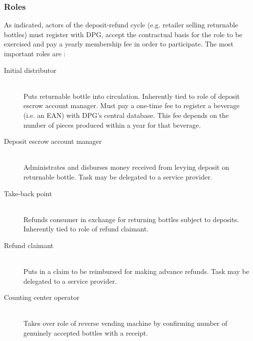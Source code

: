 
\subsubsection{Roles}
As indicated, actors of the deposit-refund cycle (e.g. retailer selling returnable bottles) must register with \ac{DPG}, accept the contractual basis for the role to be exercised and pay a yearly membership fee in order to participate. The most important roles are  \cite[pp.~15-16]{Hartlep2011Recycling}:   

\begin{description}
	\item[Initial distributor]
	\hfill \\
	Puts returnable bottle into circulation. Inherently tied to role of deposit escrow account manager. Must pay a one-time fee to register a beverage (i.e. an \acs{EAN}) with \ac{DPG}'s central database. This fee depends on the number of pieces produced within a year for that beverage.
	\item[Deposit escrow account manager]
	\hfill \\
	Administrates and disburses money received from levying deposit on returnable bottle. Task may be delegated to a service provider.
	\item[Take-back point]
	\hfill \\
	Refunds consumer in exchange for returning bottles subject to deposits. Inherently tied to role of refund claimant.
	\item[Refund claimant]
	\hfill \\
	Puts in a claim to be reimbursed for making advance refunds. Task may be delegated to a service provider.
	\item[Counting center operator]
	\hfill \\
	Takes over role of reverse vending machine by confirming number of genuinely accepted bottles with a receipt. 
	
\end{description}

